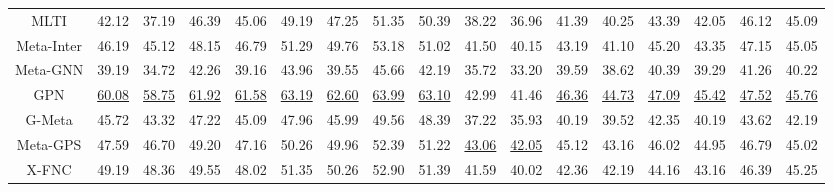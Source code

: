 \begin{table*}[ht]
{\begin{tabular}{@{}c|cccccccc|cccccccc@{}}
MLTI                   & 42.12          & 37.19          & 46.39          & 45.06          & 49.19          & 47.25          & 51.35          & 50.39          & 38.22          & 36.96          & 41.39          & 40.25          & 43.39          & 42.05          & 46.12          & 45.09          \\
Meta-Inter                   & 46.19          & 45.12          & 48.15          & 46.79          & 51.29          & 49.76          & 53.18          & 51.02          & 41.50          & 40.15          & 43.19          & 41.10          & 45.20          & 43.35          & 47.15          & 45.05          \\ \midrule
Meta-GNN                 & 39.19          & 34.72          & 42.26          & 39.16          & 43.96          & 39.55          & 45.66          & 42.19          & 35.72          & 33.20          & 39.59          & 38.62          & 40.39          & 39.29          & 41.26          & 40.22          \\
GPN                      & \underline{60.08}    & \underline{58.75}    & \underline{61.92}    & \underline{61.58}    & \underline{63.19}    & \underline{62.60}    & \underline{63.99}    & \underline{63.10}    & 42.99          & 41.46          & \underline{46.36}    & \underline{44.73}    & \underline{47.09}    & \underline{45.42}    & \underline{47.52}          & \underline{45.76}          \\
G-Meta                   & 45.72          & 43.32          & 47.22          & 45.09          & 47.96          & 45.99          & 49.56          & 48.39          & 37.22          & 35.93          & 40.19          & 39.52          & 42.35          & 40.19          & 43.62          & 42.19          \\
Meta-GPS                 & 47.59          & 46.70          & 49.20          & 47.16          & 50.26          & 49.96          & 52.39          & 51.22          & \underline{43.06}          & \underline{42.05}          & 45.12          & 43.16          & 46.02          & 44.95          & 46.79          & 45.02          \\
X-FNC                    & 49.19          & 48.36          & 49.55          & 48.02          & 51.35          & 50.26          & 52.90          & 51.39          & 41.59          & 40.02          & 42.36          & 42.19          & 44.16          & 43.16          & 46.39          & 45.25          \\ 

\end{tabular}}
\end{table*}
